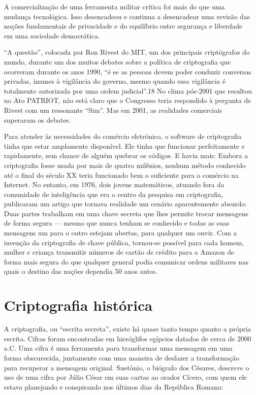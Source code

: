 \documentclass{book}
\begin{document}
A comercialização de uma ferramenta militar crítica foi mais do que uma mudança tecnológica. Isso desencadeou e continua a desencadear uma revisão das noções fundamentais de privacidade e do equilíbrio entre segurança e liberdade em uma sociedade democrática.

``A questão'', colocada por Ron Rivest do MIT, um dos principais criptógrafos do mundo, durante um dos muitos debates sobre a política de criptografia que ocorreram durante os anos 1990, ``é se as pessoas devem poder conduzir conversas privadas, imunes à vigilância do governo, mesmo quando essa vigilância é totalmente autorizada por uma ordem judicial''.18 No clima pós-2001 que resultou no Ato PATRIOT, não está claro que o Congresso teria respondido à pergunta de Rivest com um ressonante ``Sim''. Mas em 2001, as realidades comerciais superaram os debates.

Para atender às necessidades do comércio eletrônico, o software de criptografia tinha que estar amplamente disponível. Ele tinha que funcionar perfeitamente e rapidamente, sem chance de alguém quebrar os códigos. E havia mais: Embora a criptografia fosse usada por mais de quatro milênios, nenhum método conhecido até o final do século XX teria funcionado bem o suficiente para o comércio na Internet. No entanto, em 1976, dois jovens matemáticos, atuando fora da comunidade de inteligência que era o centro da pesquisa em criptografia, publicaram um artigo que tornava realidade um cenário aparentemente absurdo: Duas partes trabalham em uma chave secreta que lhes permite trocar mensagens de forma segura --- mesmo que nunca tenham se conhecido e todas as suas mensagens um para o outro estejam abertas, para qualquer um ouvir. Com a invenção da criptografia de chave pública, tornou-se possível para cada homem, mulher e criança transmitir números de cartão de crédito para a Amazon de forma mais segura do que qualquer general podia comunicar ordens militares nas quais o destino das nações dependia 50 anos antes.

\section{Criptografia histórica}
\label{segredos:historica}

A criptografia, ou ``escrita secreta'', existe há quase tanto tempo quanto a própria escrita. Cifras foram encontradas em hieróglifos egípcios datados de cerca de 2000 a.C. Uma cifra é uma ferramenta para transformar uma mensagem em uma forma obscurecida, juntamente com uma maneira de desfazer a transformação para recuperar a mensagem original. Suetônio, o biógrafo dos Césares, descreve o uso de uma cifra por Júlio César em suas cartas ao orador Cícero, com quem ele estava planejando e conspirando nos últimos dias da República Romana:
\end{document}
